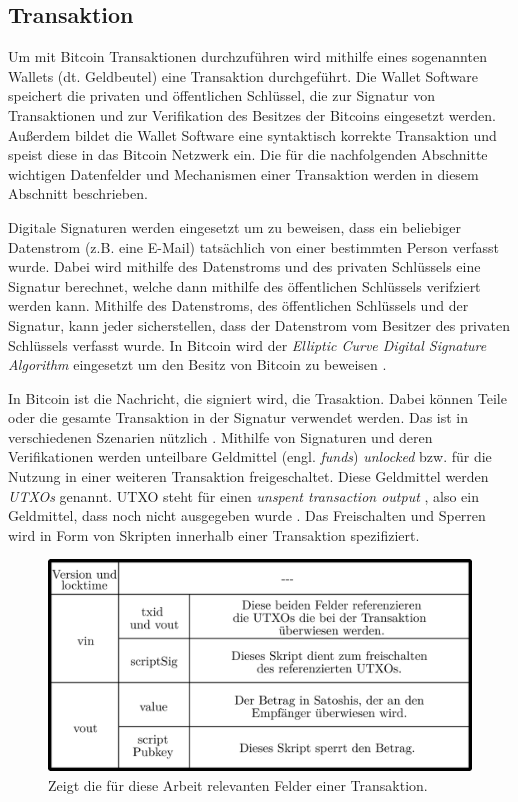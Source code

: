 \documentclass[ngerman,runningheads,a4paper]{llncs}[2018/03/10]
\begin{document}
\subsection{Transaktion}\label{sec:transaktionen}

Um mit Bitcoin Transaktionen durchzuführen wird mithilfe eines sogenannten Wallets (dt. Geldbeutel) eine Transaktion durchgeführt. Die Wallet Software speichert die privaten und öffentlichen Schlüssel, die zur Signatur von Transaktionen und zur Verifikation des Besitzes der Bitcoins eingesetzt werden. Außerdem bildet die Wallet Software eine syntaktisch korrekte Transaktion und speist diese in das Bitcoin Netzwerk ein. Die für die nachfolgenden Abschnitte wichtigen Datenfelder und Mechanismen einer Transaktion werden in diesem Abschnitt beschrieben.

Digitale Signaturen werden eingesetzt um zu beweisen, dass ein beliebiger Datenstrom (z.B. eine E-Mail) tatsächlich von einer bestimmten Person verfasst wurde. Dabei wird mithilfe des Datenstroms und des privaten Schlüssels eine Signatur berechnet, welche dann mithilfe des öffentlichen Schlüssels verifziert werden kann. Mithilfe des Datenstroms, des öffentlichen Schlüssels und der Signatur, kann jeder sicherstellen, dass der Datenstrom vom Besitzer des privaten Schlüssels verfasst wurde. In Bitcoin wird der \textit{Elliptic Curve Digital Signature Algorithm} eingesetzt um den Besitz von Bitcoin zu beweisen \citep{bitcoinbook}.

In Bitcoin ist die Nachricht, die signiert wird, die Trasaktion. Dabei können Teile oder die gesamte Transaktion in der Signatur verwendet werden. Das ist in verschiedenen Szenarien nützlich \citep{bitcoinbook}. Mithilfe von Signaturen und deren Verifikationen werden unteilbare Geldmittel (engl. \textit{funds}) \textit{unlocked} bzw. für die Nutzung in einer weiteren Transaktion freigeschaltet. Diese Geldmittel werden \textit{UTXOs} genannt. UTXO steht für einen \textit{unspent transaction output} \citep{bitcoinbook}, also ein Geldmittel, dass noch nicht ausgegeben wurde . Das Freischalten und Sperren wird in Form von Skripten innerhalb einer Transaktion spezifiziert. 

\begin{figure}
  \centering
  \includegraphics[width=.8\textwidth]{grafiken/tableTransaction.png}
  \caption{Zeigt die für diese Arbeit relevanten Felder einer Transaktion.}
  \label{fig:transactionTable}
\end{figure}
\end{document}
